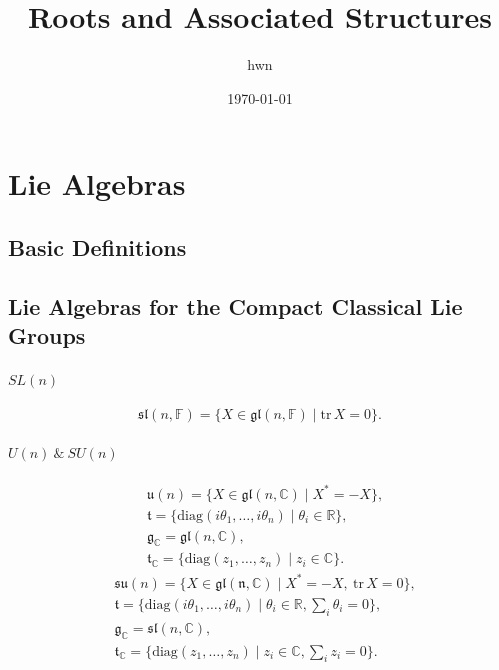 \documentclass{article}
\title{\textbf{Roots and Associated Structures}}
\author{hwn}
\date{\today}
\theoremstyle{definition}
\theoremstyle{plain}
\begin{document}
\maketitle
{}
\tableofcontents
\newpage

\section{Lie Algebras}

\subsection{Basic Definitions}

\subsection{Lie Algebras for the Compact Classical Lie Groups}

\paragraph{$ SL(n) $} 

\[
    \mathfrak{sl}(n,\mathbb{F})=\{X\in \mathfrak{gl}(n,\mathbb{F})\mid\mathrm{tr}\, X=0\}.
\]

\paragraph{$ U(n)\ \&\ SU(n) $}
\begin{align*}
    &\mathfrak{u}(n)=\{X\in\mathfrak{gl}(n,\mathbb{C} )\mid X^*=-X\},\\
    &\mathfrak{t}=\{ \mathrm{diag}(i\theta_1,\dots,i\theta_n) \mid \theta_i \in\mathbb{R} \},\\
    &\mathfrak{g}_{\mathbb{C} }=\mathfrak{gl}(n,\mathbb{C}),\\
    &\mathfrak{t}_{\mathbb{C} }=\{\mathrm{diag}(z_1,\dots,z_n)\mid z_i\in \mathbb{C} \}.
\end{align*}
\begin{align*}
    &\mathfrak{su}(n)=\{X\in \mathfrak{gl(n,\mathbb{C} )}\mid X^*=-X,\ \mathrm{tr}\, X=0\},\\
    & \mathfrak{t}=\{\mathrm{diag}(i\theta_1,\dots,i\theta_n)\mid \theta_i\in \mathbb{R}, \textstyle\sum\nolimits_i \theta_i =0\},\\
    & \mathfrak{g}_{\mathbb{C} }=\mathfrak{sl}(n,\mathbb{C} ),\\
    & \mathfrak{t}_{\mathbb{C} }=\{\mathrm{diag}(z_1,\dots,z_n)\mid z_i\in \mathbb{C} ,\textstyle\sum\nolimits_i z_i=0\}.
\end{align*}
\end{document}
